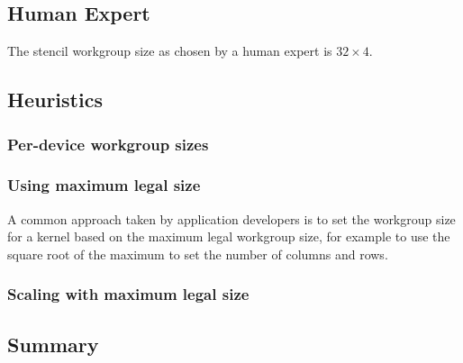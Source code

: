\subsection{Human Expert}


The stencil workgroup size as chosen by a human expert is
$32 \times 4$.




\subsection{Heuristics}

\subsubsection{Per-device workgroup sizes}


\subsubsection{Using maximum legal size}

A common approach taken by application developers is to set the
workgroup size for a kernel based on the maximum legal workgroup size,
for example to use the square root of the maximum to set the number of
columns and rows.


\subsubsection{Scaling with maximum legal size}



\subsection{Summary}

